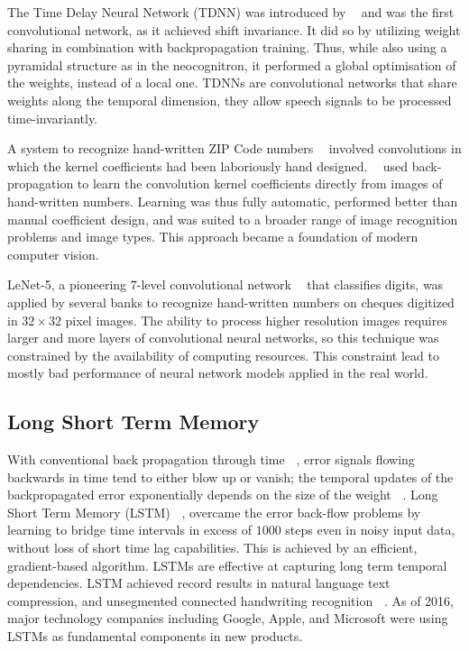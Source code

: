 \documentclass[12pt]{report}
\numberwithin{equation}{section}
\begin{document}
The Time Delay Neural Network (TDNN) was introduced by \textbf{~\cite{10.5555/108235.108263}} and was the first convolutional network, as it achieved shift invariance. It did so by utilizing weight sharing in combination with backpropagation training. Thus, while also using a pyramidal structure as in the neocognitron, it performed a global optimisation of the weights, instead of a local one. TDNNs are convolutional networks that share weights along the temporal dimension, they allow speech signals to be processed time-invariantly.

A system to recognize hand-written ZIP Code numbers \textbf{~\cite{NIPS1988_107}}  involved convolutions in which the kernel coefficients had been laboriously hand designed. \textbf{~\cite{LeCun:89}} used back-propagation to learn the convolution kernel coefficients directly from images of hand-written numbers. Learning was thus fully automatic, performed better than manual coefficient design, and was suited to a broader range of image recognition problems and image types. This approach became a foundation of modern computer vision. 

LeNet-5, a pioneering 7-level convolutional network \textbf{~\cite{lecun-gradientbased-learning-applied-1998}} that classifies digits, was applied by several banks to recognize hand-written numbers on  cheques digitized in $32\times 32$ pixel images. The ability to process higher resolution images requires larger and more layers of convolutional neural networks, so this technique was constrained by the availability of computing resources. This constraint lead to mostly bad performance of neural network models applied in the real world. 


\subsection{Long Short Term Memory}
With conventional back propagation through time \textbf{~\cite{Werbos:88gasmarket}}, error signals flowing backwards in time tend to either blow up or vanish; the temporal updates of the backpropagated error exponentially depends on the size of the weight \textbf{~\cite{10.1162/neco.1997.9.8.1735}}. Long Short Term Memory (LSTM) \textbf{~\cite{10.1162/neco.1997.9.8.1735}}, overcame the error back-flow problems by learning to bridge time intervals in excess of $1000$ steps even in noisy input data, without loss of short time lag capabilities. This is achieved by an efficient, gradient-based algorithm. LSTMs are effective at capturing long term temporal dependencies. LSTM achieved record results in natural language text compression, and unsegmented connected handwriting recognition \textbf{~\cite{graves09}}. As of 2016, major technology companies including Google, Apple, and Microsoft were using LSTMs as fundamental components in new products.
\end{document}
